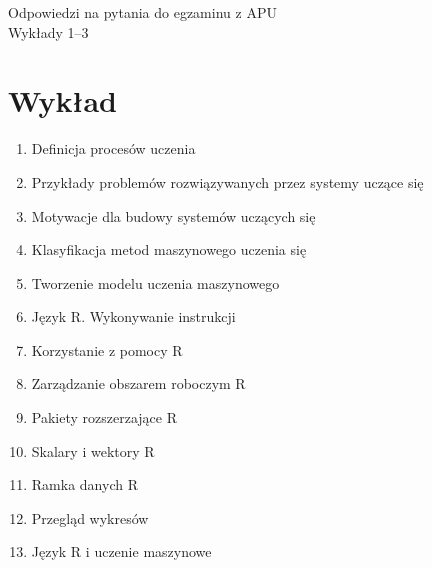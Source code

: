 ﻿\documentclass[11pt]{article}
\begin{document}
    \begin{center}
        \LARGE{Odpowiedzi na pytania do egzaminu z APU} \\
        \Large{Wykłady 1--3}
    \end{center}

    \vspace{2cm}
    
    \section{Wykład}
    \begin{enumerate}
        \item Definicja procesów uczenia
        \item Przykłady problemów rozwiązywanych przez systemy uczące się
        \item Motywacje dla budowy systemów uczących się
        \item Klasyfikacja metod maszynowego uczenia się
        \item Tworzenie modelu uczenia maszynowego
        \item Język R. Wykonywanie instrukcji
        \item Korzystanie z pomocy R
        \item Zarządzanie obszarem roboczym R
        \item Pakiety rozszerzające R
        \item Skalary i wektory R
        \item Ramka danych R
        \item Przegląd wykresów
        \item Język R i uczenie maszynowe
    \end{enumerate}
    
\end{document}
